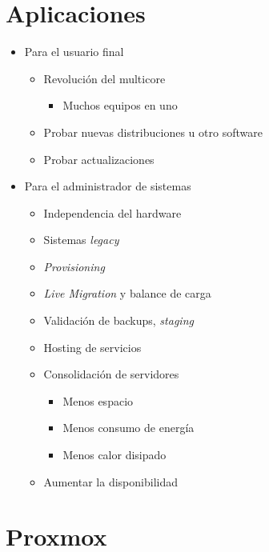 \section{Aplicaciones} 
\begin{itemize}
	\item Para el usuario final
	\begin{itemize}
		\item Revolución del multicore
			\begin{itemize}
				\item Muchos equipos en uno
			\end{itemize}
		\item Probar nuevas distribuciones u otro software
		\item Probar actualizaciones
	\end{itemize}
	\item Para el administrador de sistemas
	\begin{itemize}
		\item Independencia del hardware
		\item Sistemas \textit{legacy}
		\item \textit{Provisioning}
		\item \textit{Live Migration} y balance de carga
		\item Validación de backups, \textit{staging}
		\item Hosting de servicios
		\item Consolidación de servidores
		\begin{itemize}
			\item Menos espacio
			\item Menos consumo de energía
			\item Menos calor disipado
		\end{itemize}
		\item Aumentar la disponibilidad
	\end{itemize}
\end{itemize}


\section{Proxmox}

